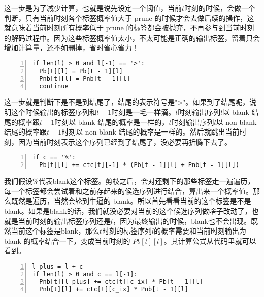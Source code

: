 {{这一步是为了减少计算，也就是说先设定一个阈值，当前$t$时刻的时候，会做一个判断，只有当前时刻各个标签概率值大于 prune 的时候才会去做后续的操作，这就意味着当前时刻所有概率低于 prune 的标签都会被抛弃，不再参与到当前时刻的解码过程中。因为这些标签概率值太小，不太可能是正确的输出标签，留着只会增加计算量，还不如删掉，省时省心省力！

\begin{lstlisting}[language = shell, numbers=left, 
         numberstyle=\tiny,keywordstyle=\color{blue!70},
         commentstyle=\color{red!50!green!50!blue!50},frame=shadowbox,
         rulesepcolor=\color{red!20!green!20!blue!20},basicstyle=\ttfamily]
if len(l) > 0 and l[-1] == '>':
  Pb[t][l] = Pb[t - 1][l]
  Pnb[t][l] = Pnb[t - 1][l]
  continue 
\end{lstlisting}

这一步就是判断下是不是到结尾了，结尾的表示符号是">"。如果到了结尾呢，说明这个时候输出的标签序列和$t-1$时刻是一毛一样滴。$t$时刻输出序列$l$以 blank 结尾的概率跟$t-1$时刻以 blank 结尾的概率是一样的，$t$时刻输出序列$l$以 non-blank 结尾的概率跟$t-1$时刻以 non-blank 结尾的概率是一样的。然后就跳出当前时刻，因为当前时刻表示这个序列已经到了结尾了，没必要再折腾下去了。
 
\begin{lstlisting}[language = shell, numbers=left, 
         numberstyle=\tiny,keywordstyle=\color{blue!70},
         commentstyle=\color{red!50!green!50!blue!50},frame=shadowbox,
         rulesepcolor=\color{red!20!green!20!blue!20},basicstyle=\ttfamily]
if c == '%':
  Pb[t][l] += ctc[t][-1] * (Pb[t - 1][l] + Pnb[t - 1][l])
\end{lstlisting}

我们假设$\%$代表blank这个标签。剪枝之后，会对还剩下的那些标签走一遍遍历，每一个标签都会尝试着和之前存起来的候选序列进行结合，算出来一个概率值。那么既然是遍历，当然会轮到牛逼的 blank。所以首先看看当前的这个标签是不是blank。如果是blank的话，我们就没必要对当前的这个候选序列做啥子改动了，也就是当前时刻的输出标签序列还是$l$，因为最终输出的时候，blank也不会出现。既然当前这个标签是blank，那么$t$时刻的标签序列$l$的概率需要和当前时刻输出为 blank 的概率结合一下，变成当前时刻的 $Pb[t][l]$。其计算公式从代码里就可以看到。

\begin{lstlisting}[language = shell, numbers=left, 
         numberstyle=\tiny,keywordstyle=\color{blue!70},
         commentstyle=\color{red!50!green!50!blue!50},frame=shadowbox,
         rulesepcolor=\color{red!20!green!20!blue!20},basicstyle=\ttfamily]
l_plus = l + c
if len(l) > 0 and c == l[-1]:
  Pnb[t][l_plus] += ctc[t][c_ix] * Pb[t - 1][l]
  Pnb[t][l] += ctc[t][c_ix] * Pnb[t - 1][l]
\end{lstlisting}

}}
